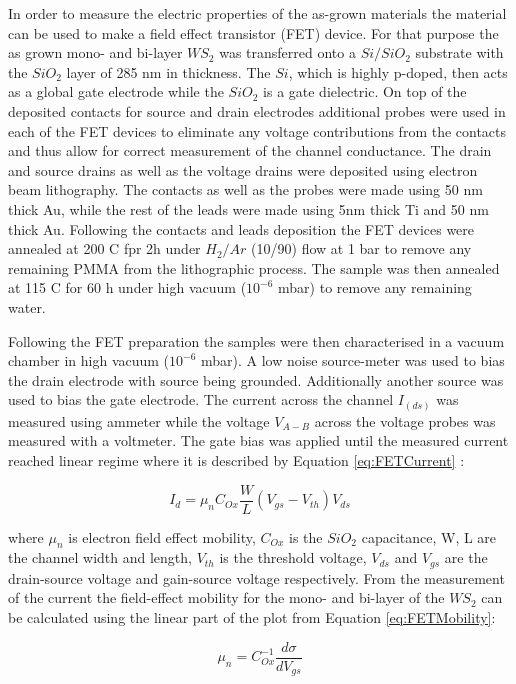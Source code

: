 In order to measure the electric properties of the as-grown materials the material can be used to make a field effect transistor (FET) device. For that purpose the as grown mono- and bi-layer $WS_2$ was transferred onto a $Si/SiO_2$ substrate with the $SiO_2$ layer of 285 nm in thickness. The $Si$, which is highly p-doped, then acts as a global gate electrode while the $SiO_2$ is a gate dielectric. On top of the deposited contacts for source and drain electrodes additional probes were used in each of the FET devices to eliminate any voltage contributions from the contacts and thus allow for correct measurement of the channel conductance. The drain and source drains as well as the voltage drains were deposited using electron beam lithography. The contacts as well as the probes were made using 50 nm thick Au, while the rest of the leads were made using 5nm thick Ti and 50 nm thick Au. Following the contacts and leads deposition the FET devices were annealed at 200 {\degree}C fpr 2h under $H_2/Ar$ (10/90) flow at 1 bar to remove any remaining PMMA from the lithographic process. The sample was then annealed at 115 {\degree}C for 60 h under high vacuum ($10^{-6}$ mbar) to remove any remaining water.

Following the FET preparation the samples were then characterised in a vacuum chamber in high vacuum ($10^{-6}$ mbar). A low noise source-meter was used to bias the drain electrode with source being grounded. Additionally another source was used to bias the gate electrode. The current across the channel $I_(ds)$ was measured using ammeter while the voltage $V_{A-B}$ across the voltage probes was measured with a voltmeter. The gate bias was applied until the measured current reached linear regime where it is described by Equation \ref{eq:FETCurrent} \cite{Sze2006}: 

\begin{equation}
I_d = {\mu}_nC_{Ox}\frac{W}{L}(V_{gs} - V_{th})V_{ds}
\label{eq:FETCurrent}
\end{equation}

where ${\mu}_n$ is electron field effect mobility, $C_{Ox}$ is the $SiO_2$ capacitance, W, L are the channel width and length, $V_{th}$ is the threshold voltage, $V_{ds}$ and $V_{gs}$ are the drain-source voltage and gain-source voltage respectively. From the measurement of the current the field-effect mobility for the mono- and bi-layer of the $WS_2$ can be calculated using the linear part of the plot from Equation \ref{eq:FETMobility}: 

\begin{equation}
\mu_{n} = C_{Ox}^{-1}\frac{d{\sigma}}{dV_{gs}}
\label{eq:FETMobility}
\end{equation}

